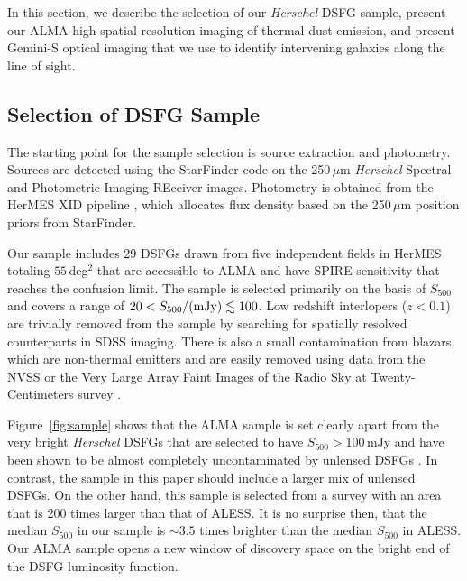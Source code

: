 \documentclass[iop]{emulateapj}
\begin{document}
In this section, we describe the selection of our {\it Herschel} DSFG sample,
present our ALMA high-spatial resolution imaging of thermal dust emission, and
present Gemini-S optical imaging that we use to identify intervening galaxies
along the line of sight.  

\subsection{Selection of DSFG Sample}\label{sec:select}

The starting point for the sample selection is source extraction and
photometry.  Sources are detected using the {\sc StarFinder} code
\citep{Diolaiti:2000qy} on the 250$\, \mu$m {\it Herschel} Spectral and
Photometric Imaging REceiver \citep[SPIRE;][]{2010A&A...518L...3G} images.
Photometry is obtained from the HerMES XID pipeline \citep{Roseboom:2010lk},
which allocates flux density based on the 250$\, \mu$m position priors from
{\sc StarFinder}.  

Our sample includes 29 DSFGs drawn from five independent fields in HerMES
totaling $55\,$deg$^2$ that are accessible to ALMA and have SPIRE sensitivity
that reaches the confusion limit.  The sample is selected primarily on the
basis of $S_{500}$ and covers a range of $20 < S_{500}/{\rm (mJy)} \lesssim
100$.  Low redshift interlopers ($z < 0.1$) are trivially removed from the
sample by searching for spatially resolved counterparts in SDSS imaging.  There
is also a small contamination from blazars, which are non-thermal emitters and
are easily removed using data from the NVSS or the Very Large Array Faint
Images of the Radio Sky at Twenty-Centimeters survey
\citep[FIRST;][]{Becker:1995fj}.  

Figure~\ref{fig:sample} shows that the ALMA sample is set clearly apart from
the very bright {\it Herschel} DSFGs that are selected to have $S_{500} > 100
\, $mJy and have been shown to be almost completely uncontaminated by unlensed
DSFGs \citep{Negrello:2010fk, Wardlow:2013lr, Bussmann:2013lr}.  In contrast,
the sample in this paper should include a larger mix of unlensed DSFGs.  On the
other hand, this sample is selected from a survey with an area that is 200
times larger than that of ALESS.  It is no surprise then, that the median
$S_{500}$ in our sample is $\sim3.5$ times brighter than the median $S_{500}$
in ALESS.  Our ALMA sample opens a new window of discovery space on the bright
end of the DSFG luminosity function.
\end{document}
